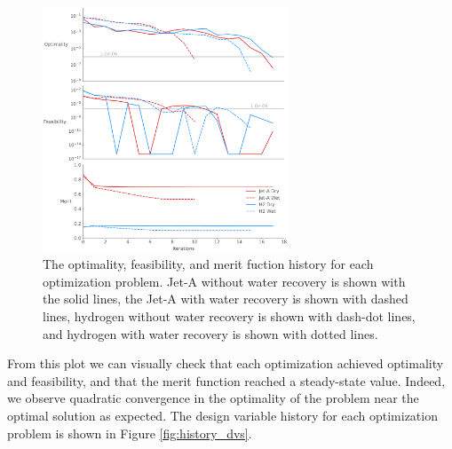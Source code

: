 \documentclass[conf]{new-aiaa}
\begin{document}
\begin{figure}[hbt!]
    \centering
    \includegraphics[width=0.65\textwidth]{opt_summary.pdf}
    \caption{The optimality, feasibility, and merit fuction history for each optimization problem.
        Jet-A without water recovery is shown with the solid lines, the Jet-A with water recovery is shown with dashed lines, hydrogen without water recovery is shown with dash-dot lines, and hydrogen with water recovery is shown with dotted lines.}
    \label{fig:history_summary}
\end{figure}

From this plot we can visually check that each optimization achieved optimality and feasibility, and that the merit function reached a steady-state value.
Indeed, we observe quadratic convergence in the optimality of the problem near the optimal solution as expected.
The design variable history for each optimization problem is shown in Figure \ref{fig:history_dvs}.
\end{document}
